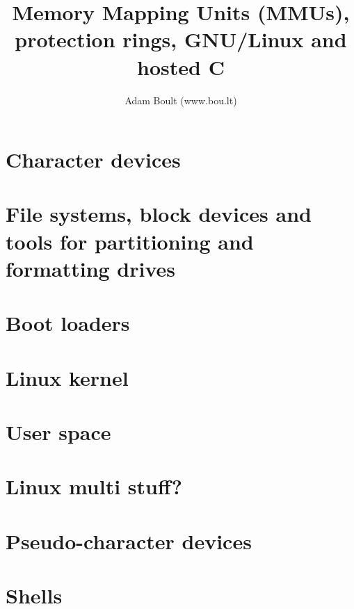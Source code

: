 \documentclass[oneside]{book}
\begin{document}
\author{Adam Boult (www.bou.lt)}
\title{Memory Mapping Units (MMUs), protection rings, GNU/Linux and hosted C}
\maketitle

\setcounter{tocdepth}{0}
\tableofcontents



\part{Character devices}


\part{File systems, block devices and tools for partitioning and formatting drives}






\part{Boot loaders}



\part{Linux kernel}




\part{User space}




\part{Linux multi stuff?}




\part{Pseudo-character devices}



\part{Shells}




\end{document}
